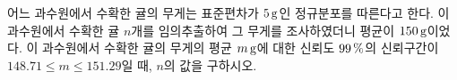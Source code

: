 어느 과수원에서 수확한 귤의 무게는 표준편차가 $5\mkern3mu \mathrm{g}$인 정규분포를 따른다고 한다. 이 과수원에서 수확한 귤 $n$개를 임의추출하여 그 무게를 조사하였더니 평균이 $150\mkern3mu \mathrm{g}$이었다. 이 과수원에서 수확한 귤의 무게의 평균 $m\mkern3mu \mathrm{g}$에 대한 신뢰도 $99\mkern3mu \%$의 신뢰구간이 $148.71\le m\le 151.29$일 때, $n$의 값을 구하시오. 
